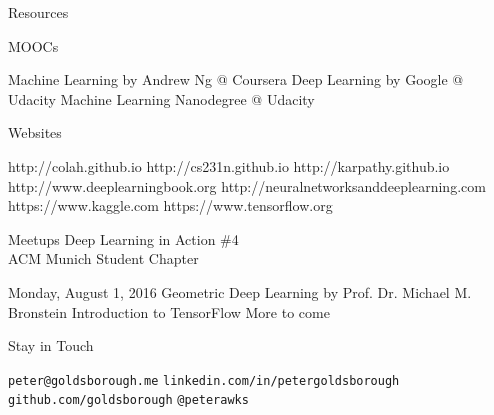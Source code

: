 

\begin{slide}{Resources}
  \begin{itemize}
    \pitem MOOCs
    \begin{itemize}
      \pitem Machine Learning by Andrew Ng @ Coursera
      \pitem Deep Learning by Google @ Udacity
      \pitem Machine Learning Nanodegree @ Udacity
    \end{itemize}
    \pitem Websites
    \begin{itemize}
      \pitem http://colah.github.io
      \pitem http://cs231n.github.io
      \pitem http://karpathy.github.io
      \pitem http://www.deeplearningbook.org
      \pitem http://neuralnetworksanddeeplearning.com
      \pitem https://www.kaggle.com
      \pitem https://www.tensorflow.org
    \end{itemize}
  \end{itemize}
\end{slide}

\begin{slide}{Meetups}
  {\Large Deep Learning in Action \#4}\\
  \vspace{0.2cm}
  {\large ACM Munich Student Chapter}
  \vspace{0.5cm}

  \begin{itemize}
    \pitem Monday, August 1, 2016
    \pitem Geometric Deep Learning by Prof. Dr. Michael M. Bronstein %
    \pitem Introduction to TensorFlow
    \pitem More to come
  \end{itemize}
\end{slide}

\begin{slide}{Stay in Touch}
  \begin{itemize}
    \pitem \texttt{peter@goldsborough.me}
    \pitem \texttt{linkedin.com/in/petergoldsborough}
    \pitem \texttt{github.com/goldsborough}
    \pitem \texttt{@peterawks}
  \end{itemize}
\end{slide}

